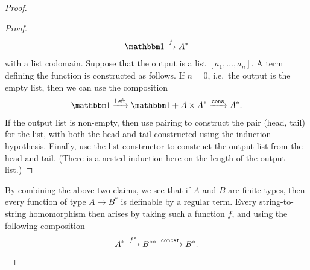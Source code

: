 \begin{proof}
\begin{proof}
\begin{align*}
\onetype \xrightarrow f A^*
\end{align*}
with a list codomain. Suppose that the output is a list $[a_1,\ldots,a_n]$. A term defining the function is constructed as follows. If $n=0$, i.e.~the output is the empty list, then we can use the composition
\begin{align*}
\onetype \xrightarrow{\leftterm} \onetype + A \times A^* \xrightarrow {\consterm} A^*.
\end{align*}
If the output list is non-empty, then use pairing to construct the pair (head, tail) for the list, with both the head and tail constructed using the induction hypothesis. Finally, use the list constructor to construct the output list from the head and tail. (There is a nested induction here on the length of the output list.) 
\end{proof}

By combining the above two claims, we see that if $A$ and $B$ are finite types, then every function of type $A \to B^*$ is definable by a regular term. Every  string-to-string homomorphism  then arises by taking such a function $f$, and using the following composition
\begin{align*}
    A^* \xrightarrow{f^*} B^{**} \xrightarrow {\mathtt{concat}} B^*.
\end{align*}
\end{proof}

